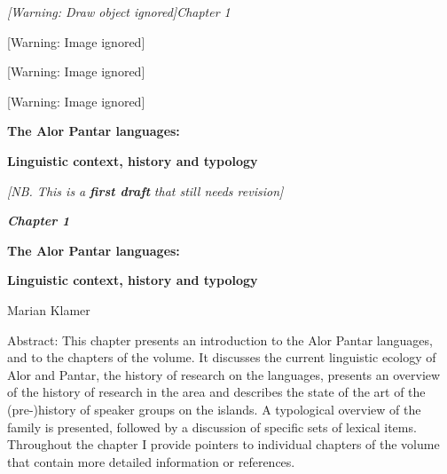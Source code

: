 
\clearpage\setcounter{page}{1}\pagestyle{Standard}
{\centering\itshape
[Warning: Draw object ignored]Chapter 1
\par}

\begin{center}
 [Warning: Image ignored] %

\end{center}
\begin{center}
 [Warning: Image ignored] %

\end{center}
\begin{center}
 [Warning: Image ignored] %

\end{center}
{\centering\bfseries
The Alor Pantar languages: 
\par}

{\centering\bfseries
Linguistic context, history and typology  
\par}

\textit{[NB. This is a }\textbf{\textit{first draft}}\textit{ that still needs revision]}

{\centering\bfseries\itshape
Chapter 1
\par}

{\centering\bfseries
The Alor Pantar languages: 
\par}

{\centering\bfseries
Linguistic context, history and typology  
\par}

{\centering
Marian Klamer
\par}

Abstract: This chapter presents an introduction to the Alor Pantar languages, and to the chapters of the volume. It discusses the current linguistic ecology of Alor and Pantar, the history of research on the languages, presents an overview of the history of research in the area and describes the state of the art of the (pre-)history of speaker groups on the islands. A typological overview of the family is presented, followed by a discussion of specific sets of lexical items. Throughout the chapter I provide pointers to individual chapters of the volume that contain more detailed information or references. 

